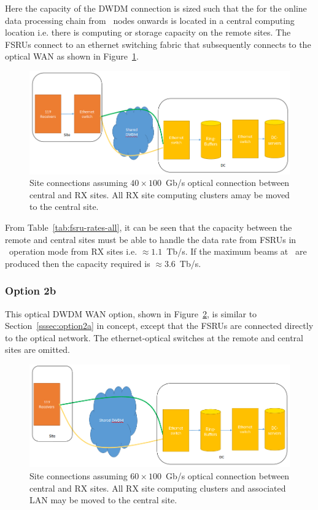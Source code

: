 \documentclass[12pt,a4paper]{article}
\begin{document}
Here the capacity of the DWDM connection is sized such that the
\einfra for the 
online data processing chain from \RB\ nodes onwards is located in a central computing location i.e. there is computing or storage capacity on the remote sites.
The FSRUs connect to an ethernet switching fabric that subsequently connects to the optical WAN as shown in Figure~\ref{fig:option_2a}.
\begin{figure}[h]
\centering
\includegraphics[width=\textwidth]{photon_option_2a.png}
\caption{Site connections assuming $40\times100$~Gb/s optical connection between central and RX sites. All RX site computing clusters amay be moved to the central site. \label{fig:option_2a}
}
\end{figure}
From Table~\ref{tab:fsru-rates-all}, it can be seen that the capacity between the remote and central sites must be able to handle the data rate from FSRUs in \WBW\ operation mode from RX sites i.e. $\approx 1.1$~Tb/s.
If the maximum beams at \WBW\ are produced then the capacity required is $\approx 3.6$~Tb/s.


\subsubsection{Option 2b}
\label{sssec:option2b}
This optical DWDM WAN option, shown in Figure~\ref{fig:option_2b}, is similar to Section~\ref{sssec:option2a} in concept, except that the FSRUs are connected directly to the optical network.
The ethernet-optical switches at the remote and central sites are omitted.
\begin{figure}[h]
\centering
\includegraphics[width=\textwidth]{photon_option_2b.png}
\caption{Site connections assuming $60\times100$~Gb/s optical connection between central and RX sites. All RX site computing clusters and associated LAN may be moved to the central site.\label{fig:option_2b}
}
\end{figure}
\end{document}

